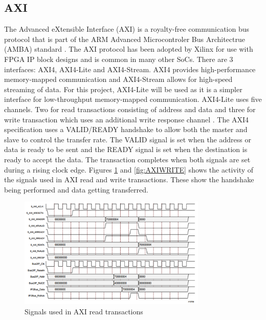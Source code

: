 \subsection{AXI}
The Advanced eXtensible Interface (AXI) is a royalty\mbox{-}free communication bus protocol that is part of the ARM Advanced Microcontroler Bus Architectrue (AMBA) standard \cite{AMBAAXI}. The AXI protocol has been adopted by Xilinx for use with FPGA IP block designs \cite{XILINXAXI} and is common in many other SoCs. There are 3 interfaces: AXI4, AXI4\mbox{-}Lite and AXI4\mbox{-}Stream. AXI4 provides high\mbox{-}performance memory\mbox{-}mapped communication and AXI4\mbox{-}Stream allows for high\mbox{-}speed streaming of data. For this project, AXI4\mbox{-}Lite will be used as it is a simpler interface for low\mbox{-}throughput memory\mbox{-}mapped communication. AXI4\mbox{-}Lite uses five channels. Two for read transactions consisting of address and data and three for write transaction which uses an additional write response channel \cite{REALDIGITAL1}. The AXI4 specification uses a VALID/READY handshake to allow both the master and slave to control the transfer rate. The VALID signal is set when the address or data is ready to be sent and the READY signal is set when the destination is ready to accept the data. The transaction completes when both signals are set during a rising clock edge. Figures \ref{fig:AXIREAD} and \ref{fig:AXIWRITE} shows the activity of the signals used in AXI read and write transactions. These show the handshake being performed and data getting transferred.

\begin{figure}[h]
	\centering
	\includegraphics[width=0.8\textwidth]{axiread.png}
	\caption{Signals used in AXI read transactions \cite{REALDIGITAL1}}
	\label{fig:AXIREAD}
\end{figure}

